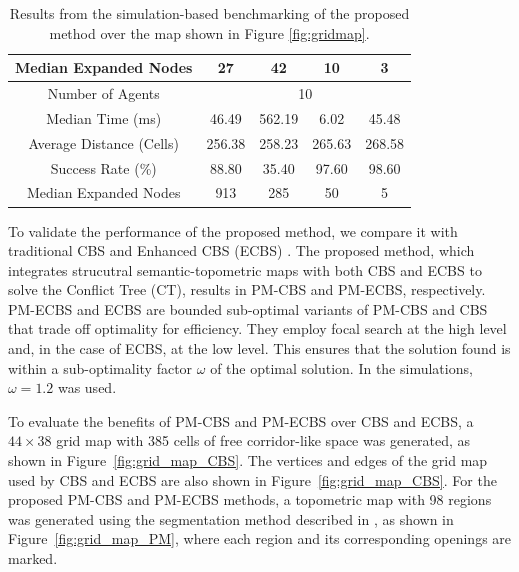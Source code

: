 \documentclass[letterpaper, 10 pt, conference]{ieeeconf}  %
\begin{document}
\begin{table}[b]
{\begin{tabular}{|c|cccc|}
         Median Expanded Nodes & 27 & 42 & 10 & 3  \\ \hline
         
         
         Number of Agents   & \multicolumn{4}{c|}{10}  \\ 
         
         Median Time (ms) & 46.49 & 562.19 & 6.02 & 45.48 \\

         Average Distance (Cells) & 256.38 & 258.23 & 265.63 & 268.58 \\
         
         Success Rate (\%) & 88.80 & 35.40 & 97.60 & 98.60 \\

         Median Expanded Nodes & 913 & 285 & 50 & 5  \\ 
         \hline
    \end{tabular}}
    \caption{Results from the simulation-based benchmarking of the proposed method over the map shown in Figure \ref{fig:gridmap}.}
    \label{tab:sim_result}
\end{table}
%
To validate the performance of the proposed method, we compare it with traditional CBS \cite{sharon2015conflict} and Enhanced CBS (ECBS) \cite{barer2014suboptimal}. The proposed method, which integrates strucutral semantic-topometric maps with both CBS and ECBS to solve the Conflict Tree (CT), results in PM-CBS and PM-ECBS, respectively. PM-ECBS and ECBS are bounded sub-optimal variants of PM-CBS and CBS that trade off optimality for efficiency. They employ focal search at the high level and, in the case of ECBS, at the low level. This ensures that the solution found is within a sub-optimality factor $\omega$ of the optimal solution. In the simulations, $\omega = 1.2$ was used.

To evaluate the benefits of PM-CBS and PM-ECBS over CBS and ECBS, a $44 \times 38$ grid map with 385 cells of free corridor-like space was generated, as shown in Figure~\ref{fig:grid_map_CBS}. The vertices and edges of the grid map used by CBS and ECBS are also shown in Figure~\ref{fig:grid_map_CBS}. For the proposed PM-CBS and PM-ECBS methods, a topometric map with 98 regions was generated using the segmentation method described in \cite{FREDRIKSSON_SEMANTIC_MAPPING}, as shown in Figure~\ref{fig:grid_map_PM}, where each region and its corresponding openings are marked.
\end{document}
